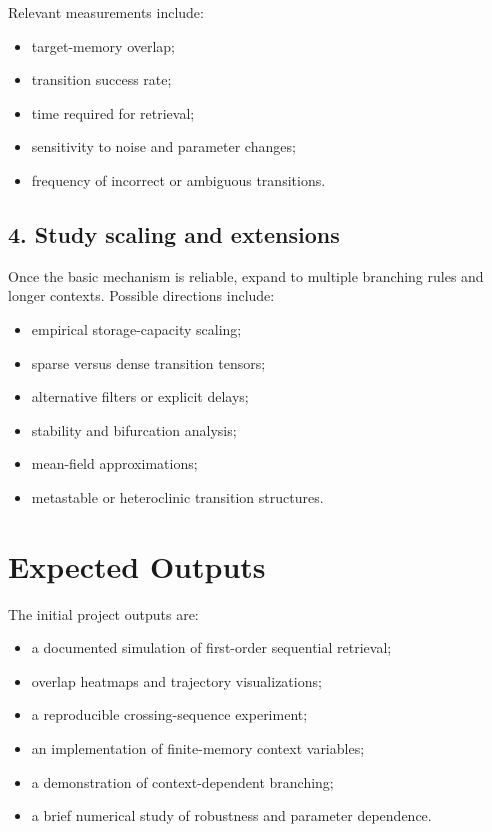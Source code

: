 \documentclass[11pt]{article}
\begin{document}
Relevant measurements include:
\begin{itemize}
    \item target-memory overlap;
    \item transition success rate;
    \item time required for retrieval;
    \item sensitivity to noise and parameter changes;
    \item frequency of incorrect or ambiguous transitions.
\end{itemize}

\subsection*{4. Study scaling and extensions}

Once the basic mechanism is reliable, expand to multiple branching rules and longer contexts. Possible directions include:
\begin{itemize}
    \item empirical storage-capacity scaling;
    \item sparse versus dense transition tensors;
    \item alternative filters or explicit delays;
    \item stability and bifurcation analysis;
    \item mean-field approximations;
    \item metastable or heteroclinic transition structures.
\end{itemize}

\section{Expected Outputs}

The initial project outputs are:

\begin{itemize}
    \item a documented simulation of first-order sequential retrieval;
    \item overlap heatmaps and trajectory visualizations;
    \item a reproducible crossing-sequence experiment;
    \item an implementation of finite-memory context variables;
    \item a demonstration of context-dependent branching;
    \item a brief numerical study of robustness and parameter dependence.
\end{itemize}
\end{document}
